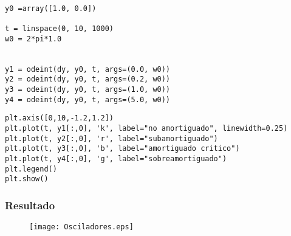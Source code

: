 \begin{frame}[fragile]
\begin{lstlisting}

y0 =array([1.0, 0.0])

t = linspace(0, 10, 1000)
w0 = 2*pi*1.0


y1 = odeint(dy, y0, t, args=(0.0, w0))
y2 = odeint(dy, y0, t, args=(0.2, w0))
y3 = odeint(dy, y0, t, args=(1.0, w0))
y4 = odeint(dy, y0, t, args=(5.0, w0))
\end{lstlisting}
\end{frame}
\begin{frame}[fragile]
\begin{lstlisting}
plt.axis([0,10,-1.2,1.2])
plt.plot(t, y1[:,0], 'k', label="no amortiguado", linewidth=0.25)
plt.plot(t, y2[:,0], 'r', label="subamortiguado")
plt.plot(t, y3[:,0], 'b', label="amortiguado critico")
plt.plot(t, y4[:,0], 'g', label="sobreamortiguado")
plt.legend()
plt.show()
\end{lstlisting}
\end{frame}
\begin{frame}[fragile]
\frametitle{Resultado}
\begin{figure}
	\centering
	\texttt{[image: Osciladores.eps]} 
\end{figure}
\end{frame}

